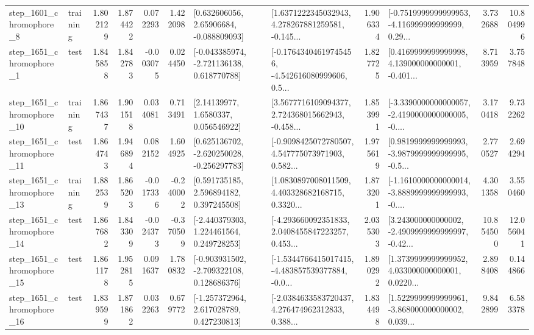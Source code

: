\begin{tabular}{llrrrrllrlrr}
  step\_1601\_chromophore\_8 &  training &      1.802129 &    1.874422 &      0.072293 &  1.422098 &     [0.632606056, 2.65906684, -0.088809093] &  [1.6371222345032943, 4.278267881259581, -0.145... &       1.906334 &  [-0.7519999999999953, -4.116999999999999, 0.29... &            3.732688 &         10.804996 \\
  step\_1651\_chromophore\_1 &      test &      1.845858 &    1.842783 &     -0.003075 &  0.024450 &   [-0.043385974, -2.721136138, 0.618770788] &  [-0.17643404619745456, -4.542616080999606, 0.5... &       1.827725 &  [0.4169999999999998, 4.139000000000001, -0.401... &            8.713959 &          3.757848 \\
 step\_1651\_chromophore\_10 &  training &      1.867437 &    1.901518 &      0.034081 &  0.713491 &        [2.14139977, 1.6580337, 0.056546922] &  [3.5677716109094377, 2.724368015662943, -0.458... &       1.853991 &  [-3.3390000000000057, -2.4190000000000005, -0.... &            3.170418 &          9.732262 \\
 step\_1651\_chromophore\_11 &      test &      1.864743 &    1.946894 &      0.082152 &  1.604925 &   [0.625136702, -2.620250028, -0.256297783] &  [-0.9098425072780507, 4.547775073971903, 0.582... &       1.975619 &  [0.9819999999999993, -3.9879999999999995, -0.5... &            2.770527 &          2.694294 \\
 step\_1651\_chromophore\_13 &  training &      1.882539 &    1.865203 &     -0.017336 & -0.240002 &     [0.591735185, 2.596894182, 0.397245508] &  [1.0830897008011509, 4.403328682168715, 0.3320... &       1.873201 &  [-1.1610000000000014, -3.8889999999999993, -0.... &            4.301358 &          3.550460 \\
 step\_1651\_chromophore\_14 &      test &      1.867682 &    1.843309 &     -0.024373 & -0.370509 &    [-2.440379303, 1.224461564, 0.249728253] &  [-4.293660092351833, 2.0408455847223257, 0.453... &       2.035303 &  [3.243000000000002, -2.4909999999999997, -0.42... &           10.854500 &         12.056041 \\
 step\_1651\_chromophore\_15 &      test &      1.861178 &    1.952815 &      0.091637 &  1.780832 &   [-0.903931502, -2.709322108, 0.128686376] &  [-1.5344766415017415, -4.483857539377884, -0.0... &       1.890292 &  [1.3739999999999952, 4.033000000000001, 0.0220... &            2.898408 &          0.144866 \\
 step\_1651\_chromophore\_16 &      test &      1.839599 &    1.871862 &      0.032263 &  0.679772 &    [-1.257372964, 2.617028789, 0.427230813] &  [-2.0384633583720437, 4.276474962312833, 0.388... &       1.834498 &  [1.5229999999999961, -3.868000000000002, 0.039... &            9.842899 &          6.583378 \\

\end{tabular}
